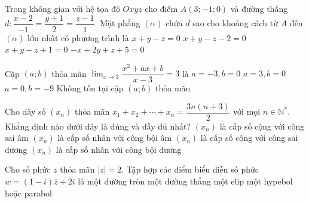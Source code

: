\begin{ex}%
Trong không gian với hệ tọa độ $Oxyz$ cho điểm $A(3;-1;0)$ và đường thẳng $d\colon\dfrac{x-2}{-1}=\dfrac{y+1}{2} = \dfrac{z-1}{1}$. Mặt phẳng $(\alpha)$ chứa $d$ sao cho khoảng cách từ $A$ đến $(\alpha)$ lớn nhất có phương trình là 
\choice
{\True $x+y-z=0$}
{$x+y-z-2=0$}
{$x+y-z+1=0$}
{$-x+2y+z+5=0$}
\end{ex}

\begin{ex}%
Cặp $(a;b)$ thỏa mãn $\displaystyle \lim_{x \to 3} \dfrac{x^2+ax+b}{x-3}=3$ là 
\choice
{\True $a=-3,b=0$}
{$a=3,b=0$}
{$a=0,b=-9$}
{Không tồn tại cặp $(a;b)$ thỏa mãn}
\end{ex}

\begin{ex}%
Cho dãy số $(x_n)$ thỏa mãn $x_1+x_2+ \cdots + x_n=\dfrac{3n(n+3)}{2}$ với mọi $n \in \mathbb{N}^*$. Khẳng định nào dưới đây là đúng và đầy đủ nhất?
\choice
{$(x_n)$ là cấp số cộng với công sai âm}
{$(x_n)$ là cấp số  nhân với công bội âm}
{\True $(x_n)$ là cấp số cộng với công sai dương}
{$(x_n)$ là cấp số  nhân với công bội  dương}
\end{ex}

\begin{ex}%
Cho số phức $z$ thỏa mãn $|z|=2$. Tập hợp các điểm biểu diễn số phức $w=(1-i)\overline{z}+2i$ là 
\choice
{\True một đường tròn}
{một đường thẳng}
{một elip}
{một hypebol hoặc parabol}
\end{ex}

